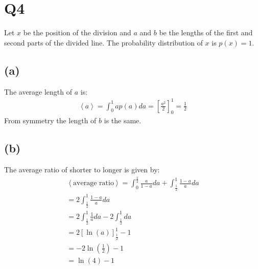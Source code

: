 \documentclass[12pt]{article}
\begin{document}
\section*{Q4}
Let $x$ be the position of the division and $a$ and $b$ be the lengths of the first and second parts of the divided line. The probability distribution of $x$ is $p(x)=1$.
\subsection*{(a)}
The average length of $a$ is:
\begin{align*}
	\left<a\right> = \int_0^1a p(a)da = \left[\frac{a^2}{2}\right]^1_0 = \frac{1}{2}
\end{align*}
From symmetry the length of $b$ is the same.
\subsection*{(b)}
The average ratio of shorter to longer is given by:
\begin{align*}
	\left<\text{average ratio}\right> = \int_0^{\frac{1}{2}} \frac{a}{1-a}da + \int_{\frac{1}{2}}^1\frac{1-a}{a}da\\
	=2\int_{\frac{1}{2}}^1\frac{1-a}{a}da\\
	=2\int_{\frac{1}{2}}^1\frac{1}{a}da - 2\int_{\frac{1}{2}}^1da \\
	=2\left[\ln\left(a\right)\right]_{\frac{1}{2}}^1 - 1 \\
	=-2\ln\left(\frac{1}{2}\right)-1\\
	=\ln(4)-1
\end{align*}
\end{document}
